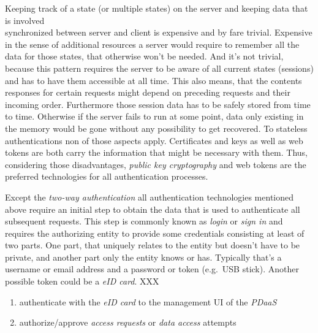 \documentclass[12pt,english,a4paper,titlepage,cleardoublepage=empty,dottedtoc]{report}
\providecommand{\tightlist}{%
  \setlength{\itemsep}{0pt}\setlength{\parskip}{0pt}}
\begin{document}
Keeping track of a state (or multiple states) on the server and keeping
data that is involved\\
synchronized between server and client is expensive and by fare trivial.
Expensive in the sense of additional resources a server would require to
remember all the data for those states, that otherwise won't be needed.
And it's not trivial, because this pattern requires the server to be
aware of all current states (sessions) and has to have them accessible
at all time. This also means, that the contents responses for certain
requests might depend on preceding requests and their incoming order.
Furthermore those session data has to be safely stored from time to
time. Otherwise if the server fails to run at some point, data only
existing in the memory would be gone without any possibility to get
recovered. To stateless authentications non of those aspects apply.
Certificates and keys as well as web tokens are both carry the
information that might be necessary with them. Thus, considering those
disadvantages, \emph{public key cryptography} and web tokens are the
preferred technologies for all authentication processes.

Except the \emph{two-way authentication} all authentication technologies
mentioned above require an initial step to obtain the data that is used
to authenticate all subsequent requests. This step is commonly known as
\emph{login} or \emph{sign in} and requires the authorizing entity to
provide some credentials consisting at least of two parts. One part,
that uniquely relates to the entity but doesn't have to be private, and
another part only the entity knows or has. Typically that's a username
or email address and a password or token (e.g.~USB stick). Another
possible token could be a \emph{eID card}. XXX

\begin{enumerate}
\def\labelenumi{(\Alph{enumi})}
\tightlist
\item
  authenticate with the \emph{eID card} to the management UI of the
  \emph{PDaaS}
\item
  authorize/approve \emph{access requests} or \emph{data access}
  attempts
\end{enumerate}
\end{document}
